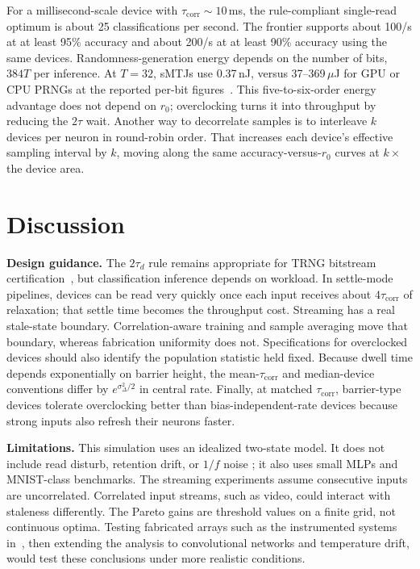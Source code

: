 \documentclass{ieeeaccess}
\newcommand{\rzero}{r_0}
\newcommand{\tauc}{\tau_{\mathrm{corr}}}
\begin{document}
For a millisecond-scale device with $\tauc\sim10$\,ms, the rule-compliant
single-read optimum is about 25 classifications per second. The frontier
supports about 100/s at at least 95\% accuracy and about 200/s at at least
90\% accuracy using the same devices. Randomness-generation energy depends
on the number of bits, $384T$ per inference. At $T{=}32$, sMTJs use
0.37\,nJ, versus 37--369\,$\mu$J for GPU or CPU PRNGs at the reported
per-bit figures~\cite{sun2026superparamagnetic}. This five-to-six-order
energy advantage does not depend on $\rzero$; overclocking turns it into
throughput by reducing the $2\tau$ wait. Another way to decorrelate samples
is to interleave $k$ devices per neuron in round-robin order. That increases
each device's effective sampling interval by $k$, moving along the same
accuracy-versus-$\rzero$ curves at $k\times$ the device area.

\section{Discussion}
\label{sec:discussion}
\textbf{Design guidance.} The $2\tau_d$ rule remains appropriate for TRNG
bitstream certification~\cite{vodenicarevic2017low,sun2026superparamagnetic},
but classification inference depends on workload. In settle-mode pipelines,
devices can be read very quickly once each input receives about $4\tauc$ of
relaxation; that settle time becomes the throughput cost. Streaming has a
real stale-state boundary. Correlation-aware training and sample averaging
move that boundary, whereas fabrication uniformity does not. Specifications
for overclocked devices should also identify the population statistic held
fixed. Because dwell time depends exponentially on barrier height, the
mean-$\tauc$ and median-device conventions differ by
$e^{\sigma_\Delta^2/2}$ in central rate. Finally, at matched $\tauc$,
barrier-type devices tolerate overclocking better than bias-independent-rate
devices because strong inputs also refresh their neurons faster.

\textbf{Limitations.} This simulation uses an idealized two-state model. It
does not include read disturb, retention drift, or $1/f$ noise
\cite{sun2026superparamagnetic}; it also uses small MLPs and MNIST-class
benchmarks. The streaming experiments assume consecutive inputs are
uncorrelated. Correlated input streams, such as video, could interact with
staleness differently. The Pareto gains are threshold values on a finite
grid, not continuous optima. Testing fabricated arrays such as the
instrumented systems in~\cite{singh2024cmos}, then extending the analysis to
convolutional networks and temperature drift, would test these conclusions
under more realistic conditions.
\end{document}

